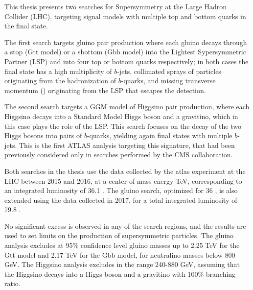 This thesis presents two searches for Supersymmetry at the Large Hadron Collider (LHC), targeting signal models with multiple top and bottom quarks in the final state.

The first search targets gluino pair production where each gluino decays through a stop
(Gtt model) or a sbottom (Gbb model) into the Lightest Sypersymmetric Partner (LSP) and into four top or bottom quarks respectively;
in both cases the final state has a high multiplicity of $b$-jets, collimated 
sprays of particles originating from the hadronization of $b$-quarks, and 
missing transverse momentum (\met) originating from the LSP  
that escapes the detection. 

The second search targets a GGM model of Higgsino pair production, 
where each Higgsino decays into a Standard Model Higgs boson and 
a gravitino, which in this case plays the role of the LSP. 
This search focuses on the decay of the two Higgs bosons into pairs of $b$-quarks, yielding again final states with multiple $b$-jets.
This is the first ATLAS analysis targeting this signature, that had been 
previously considered only in searches performed by the CMS collaboration.

Both searches in the thesis use the data collected by the \gls{atlas} experiment at the LHC 
between 2015 and 2016, at a center-of-mass energy  \cmtre TeV,
corresponding to an integrated luminosity of 36.1 \ifb.
The gluino search, optimized for 36 \ifb, is also extended using the data collected in 2017, 
for a total integrated luminosity of 79.8 \ifb.

No significant excess is observed in any of the search regions, 
and the results are used to 
set limits on the production of supersymmetric particles. 
The gluino analysis excludes at 95\% confidence level gluino masses up to 2.25 TeV for the Gtt model 
and 2.17 TeV for the Gbb model, for neutralino masses below 800 GeV.
The Higgsino analysis excludes \mhino in the range 240-880 GeV, assuming 
that the Higgsino decays into a Higgs boson and a gravitino with 100\% branching ratio. 

